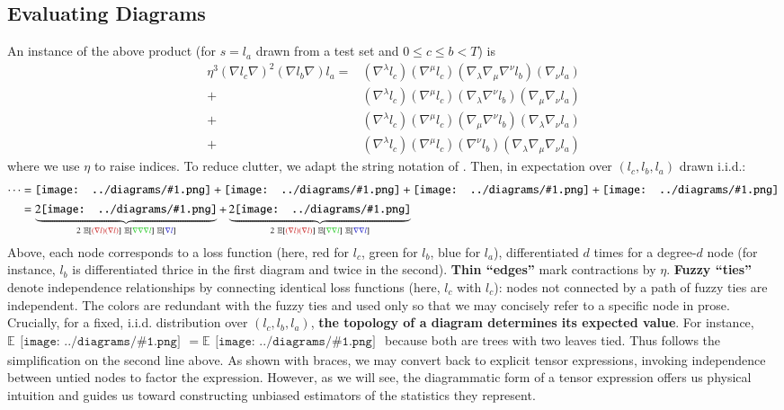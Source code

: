 \documentclass{article}
\newcommand{\expc}{\mathbb{E}}
\newcommand{\expct}[1]{\mathbb{E}\left[#1\right]}
\newcommand{\sdia}[1]{\begin{gathered}\texttt{[image: ../diagrams/\#1.png]}\end{gathered}}
\begin{document}
\subsection*{Evaluating Diagrams}
    An instance of the above product (for $s=l_a$ drawn from a test set and
    $0\leq c\leq b<T$) is \begin{align*}
        \eta^3 (\nabla l_c \nabla)^2 (\nabla l_b \nabla) l_a
        = & (\nabla^\lambda l_c) (\nabla^\mu l_c) (\nabla_\lambda \nabla_\mu \nabla^\nu l_b) (\nabla_\nu l_a) \\
        + & (\nabla^\lambda l_c) (\nabla^\mu l_c) (\nabla_\lambda \nabla^\nu l_b) (\nabla_\mu \nabla_\nu l_a) \\
        + & (\nabla^\lambda l_c) (\nabla^\mu l_c) (\nabla_\mu \nabla^\nu l_b) (\nabla_\lambda \nabla_\nu l_a) \\
        + & (\nabla^\lambda l_c) (\nabla^\mu l_c) (\nabla^\nu l_b) (\nabla_\lambda \nabla_\mu \nabla_\nu l_a)
    \end{align*}
    where we use $\eta$ to raise indices.  To reduce clutter, we adapt the
    string notation of \citet{pe71}.  Then, in expectation over $(l_c, l_b,
    l_a)$ drawn i.i.d.:
    \begin{align*}
        \cdots
        &= 
            \sdia{(01-2-3)(02-12-23)}
            +\sdia{(01-2-3)(02-13-23)}
            +\sdia{(01-2-3)(03-12-23)}
            +\sdia{(01-2-3)(03-13-23)} \\
        &=
            \underbrace{2\sdia{(01-2-3)(02-12-23)}}_{
                2~\expct{{\color{moor}(\nabla l)(\nabla l)}}~\expct{{\color{moog}\nabla\nabla\nabla l}}~\expct{{\color{moob} \nabla l}}
            }
            +
            \underbrace{2\sdia{(01-2-3)(02-13-23)}}_{
                2~\expct{{\color{moor}(\nabla l)(\nabla l)}}~\expct{{\color{moog}\nabla \nabla l}}~\expct{{\color{moob}\nabla \nabla l}}
            }
    \end{align*}
    Above, each node corresponds to a loss function (here, red for $l_c$, green
    for $l_b$, blue for $l_a$), differentiated $d$ times for a degree-$d$ node
    (for instance, $l_b$ is differentiated thrice in the first diagram and
    twice in the second).  {\bf Thin ``edges''} mark contractions by $\eta$.
    {\bf Fuzzy ``ties''} denote independence relationships by connecting
    identical loss functions (here, $l_c$ with $l_c$): nodes not connected by a
    path of fuzzy ties are independent.  The colors are redundant with the
    fuzzy ties and used only so that we may concisely refer to a specific node
    in prose.  Crucially, for a fixed, i.i.d. distribution over $(l_c, l_b,
    l_a)$, {\bf the topology of a diagram determines its expected value}.  For
    instance, $\expc \sdia{(01-2-3)(02-12-23)} = \expc
    \sdia{(01-2-3)(03-13-23)}$ because both are trees with two leaves tied.
    Thus follows the simplification on the second line above.  As shown with
    braces, we may convert back to explicit tensor expressions, invoking
    independence between untied nodes to factor the expression.  However, as we
    will see, the diagrammatic form of a tensor expression offers us physical
    intuition and guides us toward constructing unbiased estimators of the
    statistics they represent.  
    
\end{document}
